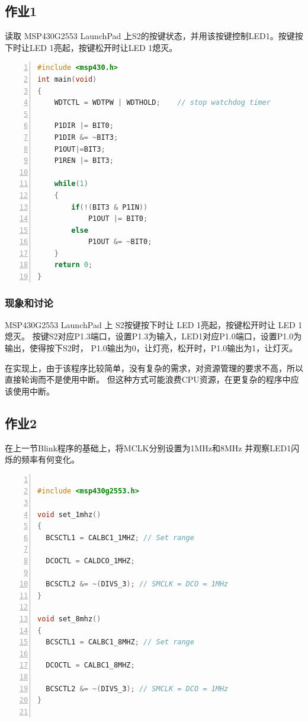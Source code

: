 \documentclass[a4paper,twoside,zihao=5,UTF8]{ctexart}
\begin{document}
\begin{spacing}{1.2}
\subsection{作业1}
读取 MSP430G2553 LaunchPad 上S2的按键状态，并用该按键控制LED1。按键按下时让LED 1亮起，按键松开时让LED 1熄灭。

\begin{lstlisting}[language=c++,numbers=left,style=CppStyle,caption=作业1,label={code:p1}]
#include <msp430.h> 
int main(void)
{
    WDTCTL = WDTPW | WDTHOLD;    // stop watchdog timer

    P1DIR |= BIT0;
    P1DIR &= ~BIT3;
    P1OUT|=BIT3;
    P1REN |= BIT3;

    while(1)
    {
        if(!(BIT3 & P1IN))
            P1OUT |= BIT0;
        else
            P1OUT &= ~BIT0;
    }
    return 0;
}
\end{lstlisting}

\subsubsection{现象和讨论}
MSP430G2553 LaunchPad 上 S2按键按下时让 LED 1亮起，按键松开时让 LED 1熄灭。
按键S2对应P1.3端口，设置P1.3为输入，LED1对应P1.0端口，设置P1.0为输出，使得按下S2时，
P1.0输出为0，让灯亮，松开时，P1.0输出为1，让灯灭。

在实现上，由于该程序比较简单，没有复杂的需求，对资源管理的要求不高，所以直接轮询而不是使用中断。
但这种方式可能浪费CPU资源，在更复杂的程序中应该使用中断。

\subsection{作业2}
在上一节Blink程序的基础上，将MCLK分别设置为1MHz和8MHz
并观察LED1闪烁的频率有何变化。

\begin{lstlisting}[language=c++,numbers=left,style=CppStyle,caption=作业2,label={code:p2}]

#include <msp430g2553.h>

void set_1mhz()
{
  BCSCTL1 = CALBC1_1MHZ; // Set range

  DCOCTL = CALDCO_1MHZ;

  BCSCTL2 &= ~(DIVS_3); // SMCLK = DCO = 1MHz
}

void set_8mhz()
{
  BCSCTL1 = CALBC1_8MHZ; // Set range

  DCOCTL = CALBC1_8MHZ;

  BCSCTL2 &= ~(DIVS_3); // SMCLK = DCO = 1MHz
}


\end{lstlisting}
\end{spacing}
\end{document}
